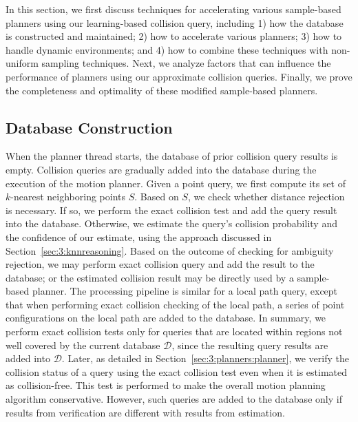 In this section, we first discuss techniques for accelerating various sample-based planners using our learning-based collision query, including 1) how the database is constructed and maintained; 2) how to accelerate various planners; 3) how to handle dynamic environments; and 4) how to combine these techniques with non-uniform sampling techniques.
Next, we analyze factors that can influence the performance of planners using our approximate collision queries. Finally, we prove the completeness and optimality of these modified sample-based planners.

\subsection{Database Construction}
When the planner thread starts, the database of prior collision query results is empty. 
Collision queries are gradually added into the database during the execution of the motion planner.
Given a point query, we first compute its set of $k$-nearest neighboring points $S$. Based on $S$, we check whether distance rejection is necessary. If so, we perform the exact collision test and add the query result into the database. Otherwise, we estimate the query's collision probability and the confidence of our estimate, using the approach discussed in Section~\ref{sec:3:knnreasoning}. Based on the outcome of checking for ambiguity rejection, we may perform exact collision query and add the result to the database; or the estimated collision result may be directly used by a sample-based planner. 
The processing pipeline is similar for a local path query, except that when performing exact collision checking of the local path, a series of point configurations on the local path are added to the database. In summary, we perform exact collision tests only for queries that are located within regions not well covered by the current database $\mathcal D$, since the resulting query results are added into $\mathcal D$. Later, as detailed in Section~\ref{sec:3:planners:planner}, we verify the collision status of a query using the exact collision test even when it is estimated as collision-free. This test is performed to make the overall motion planning algorithm conservative. However, such queries are added to the database only if results from verification are different with results from estimation.



